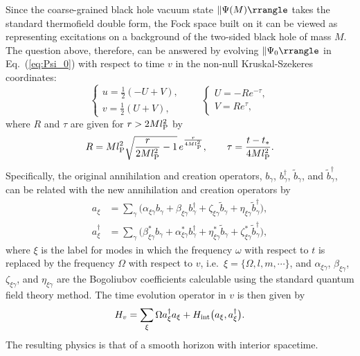\documentclass[12pt]{article}
\begin{document}
Since the coarse-grained black hole vacuum state $\ketc{\Psi(M)}$ 
takes the standard thermofield double form, the Fock space built on 
it can be viewed as representing excitations on a background of the 
two-sided black hole of mass $M$.  The question above, therefore, 
can be answered by evolving $\ketc{\Psi_0}$ in Eq.~(\ref{eq:Psi_0}) 
with respect to time $v$ in the non-null Kruskal-Szekeres 
coordinates:
%
\begin{equation}
  \left\{ \begin{array}{l} 
    u = \frac{1}{2}(-U+V), \\
    v = \frac{1}{2}(U+V), \end{array} \right.
\qquad
  \left\{ \begin{array}{l} 
    U = -R e^{-\tau}, \\
    V = R e^{\tau}, \end{array} \right.
\label{eq:Kruskal}
\end{equation}
%
where $R$ and $\tau$ are given for $r > 2M l_{\rm P}^2$ by
%
\begin{equation}
  R = Ml_{\rm P}^2 \sqrt{\frac{r}{2Ml_{\rm P}^2}-1}\, 
    e^{\frac{r}{4Ml_{\rm P}^2}},
\qquad
  \tau = \frac{t-t_*}{4Ml_{\rm P}^2}.
\label{eq:R-tau}
\end{equation}
%
Specifically, the original annihilation and creation operators, 
$b_\gamma$, $b_\gamma^\dagger$, $\tilde{b}_\gamma$, and 
$\tilde{b}_\gamma^\dagger$, can be related with the new 
annihilation and creation operators by
%
\begin{align}
  a_\xi &= \sum_\gamma 
    \bigl( \alpha_{\xi\gamma} b_\gamma 
    + \beta_{\xi\gamma} b_\gamma^\dagger 
    + \zeta_{\xi\gamma} \tilde{b}_\gamma 
    + \eta_{\xi\gamma} \tilde{b}_\gamma^\dagger \bigr),
\label{eq:a_xi}\\
  a_\xi^\dagger &= \sum_\gamma 
    \bigl( \beta_{\xi\gamma}^* b_\gamma 
    + \alpha_{\xi\gamma}^* b_\gamma^\dagger 
    + \eta_{\xi\gamma}^* \tilde{b}_\gamma 
    + \zeta_{\xi\gamma}^* \tilde{b}_\gamma^\dagger \bigr),
\label{eq:a_xi-dag}
\end{align}
%
where $\xi$ is the label for modes in which the frequency $\omega$ 
with respect to $t$ is replaced by the frequency $\Omega$ with 
respect to $v$, i.e.\ $\xi = \{ \Omega, l, m, \cdots \}$, and 
$\alpha_{\xi\gamma}$, $\beta_{\xi\gamma}$, $\zeta_{\xi\gamma}$, 
and $\eta_{\xi\gamma}$ are the Bogoliubov coefficients calculable 
using the standard quantum field theory method.  The time evolution 
operator in $v$ is then given by
%
\begin{equation}
  H_v = \sum_\xi \Omega a_\xi^\dagger a_\xi 
    + H_{\rm int}\bigl( a_\xi, a_\xi^\dagger \bigr).
\label{eq:H_v}
\end{equation}
%
The resulting physics is that of a smooth horizon with interior 
spacetime.
\end{document}
